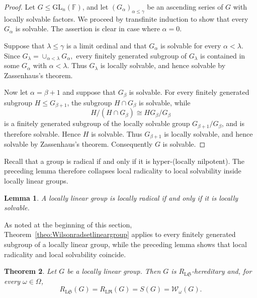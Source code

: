 \documentclass[11pt, reqno]{amsart}
\numberwithin{equation}{section}
\newtheorem{theorem}{Theorem}[section]
\newtheorem{lemma}[theorem]{Lemma}
\theoremstyle{definition}
\numberwithin{equation}{section}
\begin{document}
\begin{proof}
Let $G\leq \mathrm{GL}_n(\mathbb F)$, and let
$(G_\alpha)_{\alpha\leq\gamma}$ be an ascending series of $G$ with locally solvable factors.  We proceed by transfinite induction to show that every $G_\alpha$ is solvable. The assertion is clear in case where $\alpha =0$.  

Suppose that $\lambda\leq\gamma$ is a limit ordinal and that $G_\alpha$ is solvable for every $\alpha<\lambda$.
Since $G_\lambda=\cup_{\alpha<\lambda}G_\alpha,$ every finitely generated subgroup of $G_\lambda$ is contained in some $G_\alpha$ with $\alpha<\lambda$.  Thus $G_\lambda$ is locally solvable, and hence solvable by Zassenhaus's theorem.

Now let $\alpha=\beta+1$ and suppose that $G_\beta$ is solvable.  For every
finitely generated subgroup $H\leq G_{\beta+1}$, the subgroup
$H\cap G_\beta$ is solvable, while
$$H/(H\cap G_\beta) \cong HG_\beta/G_\beta $$
is a finitely generated subgroup of the locally solvable group
$G_{\beta+1}/G_\beta$, and is therefore solvable.  Hence $H$ is solvable.
Thus $G_{\beta+1}$ is locally solvable, and hence solvable by Zassenhaus's theorem. Consequently $G$ is solvable.
\end{proof}

Recall that a group is radical if and only if it is
hyper-(locally nilpotent). The preceding lemma therefore collapses local radicality to local solvability inside locally linear groups.

\begin{lemma} \label{lem:locradislocsol}
    A locally linear group is locally radical if and only if it is locally solvable.
\end{lemma}

As noted at the beginning of this section, Theorem~\ref{theo:Wilsonradsetlineargroup} applies to every finitely
generated subgroup of a locally linear group, while the preceding lemma shows that local radicality and local solvability coincide.

\begin{theorem} \label{theo:locradislocsol} Let $G$ be a locally linear group. Then $G$ is $R_{\mathrm{L}\mathfrak S}$-hereditary and, for every $\omega\in\Omega$, $$ R_{\mathrm{L}\mathfrak S}(G) = R_{\mathrm{L}\mathfrak R}(G) = S(G) = \mathcal W_\omega(G). $$ 
\end{theorem}
\end{document}
